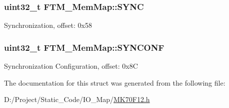 \subsubsection[{S\+Y\+N\+C}]{\setlength{\rightskip}{0pt plus 5cm}uint32\+\_\+t F\+T\+M\+\_\+\+Mem\+Map\+::\+S\+Y\+N\+C}\label{struct_f_t_m___mem_map_a9537a55fae48de4811bfe7600d37b230}
Synchronization, offset\+: 0x58 \hypertarget{struct_f_t_m___mem_map_a3bd4b174127a80c7f8bd910b66e6de60}{}
\subsubsection[{S\+Y\+N\+C\+O\+N\+F}]{\setlength{\rightskip}{0pt plus 5cm}uint32\+\_\+t F\+T\+M\+\_\+\+Mem\+Map\+::\+S\+Y\+N\+C\+O\+N\+F}\label{struct_f_t_m___mem_map_a3bd4b174127a80c7f8bd910b66e6de60}
Synchronization Configuration, offset\+: 0x8\+C 

The documentation for this struct was generated from the following file\+:\begin{DoxyCompactItemize}
\item 
D\+:/\+Project/\+Static\+\_\+\+Code/\+I\+O\+\_\+\+Map/\hyperlink{_m_k70_f12_8h}{M\+K70\+F12.\+h}\end{DoxyCompactItemize}
